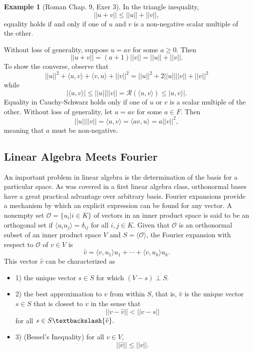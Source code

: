 \documentclass[psamsfonts]{amsart}
\theoremstyle{definition}
\newtheorem{exmp}[thm]{Example}
\theoremstyle{remark}
\numberwithin{equation}{section}
\begin{document}
\begin{exmp}[Roman Chap. 9, Exer 3]
In the triangle inequality, 
$$|| u + v || \leq ||u || + || v||, $$
equality holds if and only if one of $u$ and $v$ is a non-negative scalar multiple of the other. 

Without loss of generality, suppose $u = av$ for some $a \geq 0$. Then 
$$||u+v|| = (a+1)||v|| = ||u|| + ||v||.$$
To show the converse, observe that 
$$||u||^2 + \langle u, v \rangle + \langle v, u \rangle + ||v||^2 = ||u||^2 + 2 ||u|| ||v|| + ||v||^2 $$
while 
$$|\langle u, v \rangle | \leq || u || || v|| = \mathcal{R} (\langle u, v \rangle ) \leq | u , v \rangle |.$$
Equality in Cauchy-Schwarz holds only if one of $u$ or $v$ is a scalar multiple of the other. Without loss of generality, let $u = av$ for some $a \in F$. Then 
$$||u|| || v|| = \langle u, v \rangle = \langle av, u \rangle = a || v||^2, $$
meaning that $a$ must be non-negative. 
\end{exmp}


\subsection{Linear Algebra Meets Fourier} An important problem in linear algebra is the determination of the basis for a particular space. As was covered in a first linear algebra class, orthonormal bases have a great practical advantage over arbitrary basis. Fourier expansions provide a mechanism by which an explicit expression can be found for any vector. A nonempty set $\mathcal{O} = \{ u_i | i \in K \}$ of vectors in an inner product space is said to be an orthogonal set if $\langle u_i u_j \rangle = \delta _{ij}$ for all $i, j \in K$. Given that $\mathcal{O}$ is an orthonormal subset of an inner product space $V$ and $S = \langle \mathcal{O} \rangle$, the Fourier expansion with respect to $\mathcal{O}$ of $v \in V$ is 
$$\hat{v} = \langle v, u_1 \rangle u_1 + \cdots + \langle v, u_k \rangle u_k .$$
This vector $\hat{v}$ can be characterized as  
\begin{itemize}
    \item 1) the unique vector $s \in S$ for which $(V-s) \perp S$. 
    \item 2)  the best approximation to $v$ from within $S$, that is, $\hat{v}$ is the unique vector $s \in S$ that is closest to $v$ in the sense that 
    $$|| v - \hat{v} || < ||v - s || $$
    for all $s \in S \textbackslash \{ \hat{v} \}.$
    \item 3) (Bessel's Inequality) for all $v \in V$, 
    $$||\hat{v} || \leq || v ||.  $$
\end{itemize}
\end{document}
